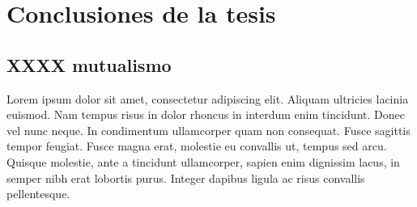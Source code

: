 
\chapter{Conclusiones de la tesis} %

\label{CONCLUSIONES} %


\section{XXXX mutualismo}

Lorem ipsum dolor sit amet, consectetur adipiscing elit. Aliquam ultricies lacinia euismod. Nam tempus risus in dolor rhoncus in interdum enim tincidunt. Donec vel nunc neque. In condimentum ullamcorper quam non consequat. Fusce sagittis tempor feugiat. Fusce magna erat, molestie eu convallis ut, tempus sed arcu. Quisque molestie, ante a tincidunt ullamcorper, sapien enim dignissim lacus, in semper nibh erat lobortis purus. Integer dapibus ligula ac risus convallis pellentesque.
